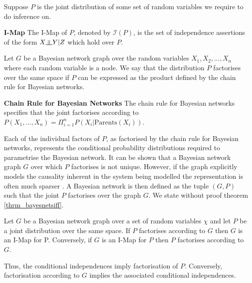 Suppose $P$ is the joint distribution of some set of random variables we require to do inference on.
\begin{defn}
\textbf{I-Map} The I-Map of $P$, denoted by $\mathcal{I}(P)$, is the set of independence assertions of the form $X \indep Y | Z$ which hold over $P$.
\end{defn} 
Let $G$ be a Bayesian network graph over the random variables $X_1, X_2,...,X_n$ where each random variable is a node. We say that the distribution $P$ factorises over the same space if $P$ can be expressed as the product defined by the chain rule for Bayesian networks.
\begin{defn}
\textbf{Chain Rule for Bayesian Networks} The chain rule for Bayesian networks specifies that the joint factorises according to $P(X_1,...,X_n) = \Pi_{i=1}^n P(X_i | \text{Parents}(X_i))$.
\label{def_chain_rule_bayes}
\end{defn}
Each of the individual factors of $P$, as factorised by the chain rule for Bayesian networks, represents the conditional probability distributions required to parametrise the Bayesian network. It can be shown that a Bayesian network graph $G$ over which $P$ factorises is not unique. However, if the graph explicitly models the causality inherent in the system being modelled the representation is often much sparser \cite{koller}. A Bayesian network is then defined as the tuple $(G, P)$ such that the joint $P$ factorises over the graph $G$. We state without proof theorem \ref{thrm_bayesnetsiff}. 
\begin{thrm}
Let $G$ be a Bayesian network graph over a set of random variables $\chi$ and let $P$ be a joint distribution over the same space. If $P$ factorises according to $G$ then $G$ is an I-Map for P. Conversely, if $G$ is an I-Map for $P$ then $P$ factorises according to $G$.
\label{thrm_bayesnetsiff}
\end{thrm}
Thus, the conditional independences imply factorisation of $P$. Conversely, factorisation according to $G$ implies the associated conditional independences.

